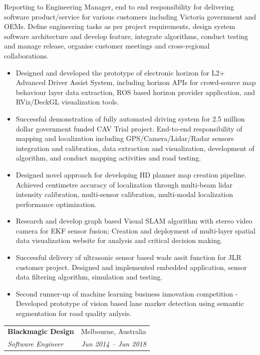 \documentclass[letterpaper,11pt]{article}
\makeatletter
\newcommand{\resumeItemNoBullet}[4]{
  \vspace{-1pt}
    \begin{tabular*}{0.97\textwidth}{l@{\extracolsep{\fill}}r}
      \textbf{#1} & #2 \\
      \textit{\small#3} & \textit{\small #4} \\
    \end{tabular*}\vspace{-7pt}
}
\newcommand{\resumeSubHeadingListStart}{\begin{itemize}[leftmargin=*]}
\newcommand{\resumeSubHeadingListEnd}{\end{itemize}}
\makeatother
\begin{document}
\vspace{10pt}
{Reporting to Engineering Manager, end to end responsibility for delivering software product/service for various customers including Victoria government and OEMs. Define engineering tasks as per project requirements, design system software architecture and develop feature, integrate algorithms, conduct testing and manage release, organise customer meetings and cross-regional collaborations. }
  \resumeSubHeadingListStart
    \item Designed and developed the prototype of electronic horizon for L2+ Advanced Driver Assist System, including horizon APIs for crowd-source map behaviour layer data extraction, ROS based horizon provider application, and RViz/DeckGL visualization tools.
    \item Successful demonstration of fully automated driving system for 2.5 million dollar government funded CAV Trial project. End-to-end responsibility of mapping and localization including GPS/Camera/Lidar/Radar sensors integration and calibration, data extraction and visualization, development of algorithm, and conduct mapping activities and road testing.
    \item Designed novel approach for developing HD planner map creation pipeline. Achieved centimetre accuracy of localization through multi-beam lidar intensity calibration, multi-sensor calibration, multi-modal localization performance optimization.
    \item Research and develop graph based Visual SLAM algorithm with stereo video camera for EKF sensor fusion; Creation and deployment of multi-layer spatial data visualization website for analysis and critical decision making.
    \item Successful delivery of ultrasonic sensor based wade assit function for JLR customer project. Designed and implemented embedded application, sensor data filtering algorithm, simulation and testing.  
    \item Second runner-up of machine learning business innovation competition - Developed prototype of vision based lane marker detection using semantic segmentation for road quality anlysis.
  \resumeSubHeadingListEnd

\resumeItemNoBullet
{Blackmagic Design}{Melbourne, Australia}
{Software Engineer}{Jun 2014 -- Jun 2018}
\end{document}
